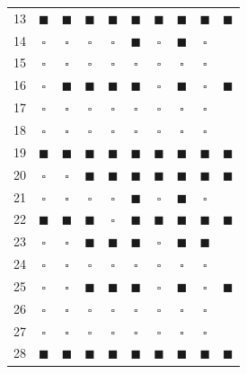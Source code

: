 \begin{table}
\begin{tabular}{c | c | c | c | c | c | c | c | c | c}
		13 & $\blacksquare$ & $\blacksquare$ & $\blacksquare$ & $\blacksquare$ & $\blacksquare$ & $\blacksquare$ & $\blacksquare$ & $\blacksquare$ & $\blacksquare$ \\
		14 & $\square$ & $\square$ & $\square$ & $\square$ & $\blacksquare$ & $\square$ & $\blacksquare$ & $\square$ &   \\
		15 & $\square$ & $\square$ & $\square$ & $\square$ & $\square$ & $\square$ & $\square$ & $\square$ & \\
		16 & $\square$ & $\blacksquare$ & $\blacksquare$ & $\blacksquare$ & $\blacksquare$ & $\square$ & $\blacksquare$ & $\square$ & $\blacksquare$ \\
		17 & $\square$ & $\square$ & $\square$ & $\square$ & $\square$ & $\square$ & $\square$ & $\square$ & \\
		18 & $\square$ & $\square$ & $\square$ & $\square$ & $\square$ & $\square$ & $\square$ & $\square$ & \\
		19 & $\blacksquare$ & $\blacksquare$ & $\blacksquare$ & $\blacksquare$ & $\blacksquare$ & $\blacksquare$ & $\blacksquare$ & $\blacksquare$ & $\blacksquare$\\
		20 & $\square$ & $\square$ & $\blacksquare$ & $\blacksquare$ & $\blacksquare$ & $\blacksquare$ & $\blacksquare$ & $\blacksquare$ & $\blacksquare$ \\
		21 & $\square$ & $\square$ & $\square$ & $\square$ & $\blacksquare$ & $\square$ & $\blacksquare$ & $\square$ & \\
		22 & $\blacksquare$ & $\blacksquare$ & $\blacksquare$ & $\square$ & $\blacksquare$ & $\blacksquare$ & $\blacksquare$ & $\blacksquare$ & $\blacksquare$ \\
		23 & $\square$ & $\square$ & $\blacksquare$ & $\blacksquare$ & $\blacksquare$ & $\square$ & $\blacksquare$ & $\blacksquare$ &  \\
		24 & $\square$ & $\square$ & $\square$ & $\square$ & $\square$ & $\square$ & $\square$ & $\square$ & \\
		25 & $\square$ & $\square$ & $\blacksquare$ & $\blacksquare$ & $\blacksquare$ & $\square$ & $\blacksquare$ & $\square$ & $\blacksquare$ \\
		26 & $\square$ & $\square$ & $\square$ & $\square$ & $\square$ & $\square$ & $\square$ & $\square$ & \\
		27 & $\square$ & $\square$ & $\square$ & $\square$ & $\square$ & $\square$ & $\square$ & $\square$ & \\
		28 & $\blacksquare$ & $\blacksquare$ & $\blacksquare$ & $\blacksquare$ & $\blacksquare$ & $\blacksquare$ & $\blacksquare$ & $\blacksquare$ & $\blacksquare$ \\

\end{tabular}
\end{table}
